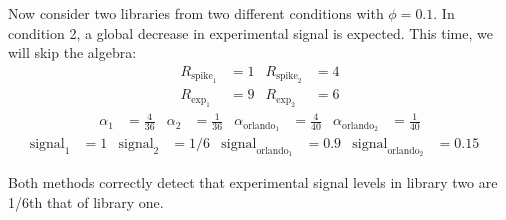 Now consider two libraries from two different conditions with $\phi=0.1$.
In condition 2, a global decrease in experimental signal is expected.
This time, we will skip the algebra:
\begin{align*}
    R_{\text{spike}_1} &= 1 & R_{\text{spike}_2} &= 4 \\
    R_{\text{exp}_1} &= 9 & R_{\text{exp}_2} &= 6
\end{align*}
\begin{align*}
    \alpha_1 &= \frac{4}{36} &
    \alpha_2 &= \frac{1}{36} &
    \alpha_{\text{orlando}_1} &= \frac{4}{40} &
    \alpha_{\text{orlando}_2} &= \frac{1}{40}
\end{align*}
\begin{align*}
    \text{signal}_1 &=  1 &
    \text{signal}_2 &=  1/6 &
    \text{signal}_{\text{orlando}_1} &= 0.9 &
    \text{signal}_{\text{orlando}_2} &= 0.15 &
\end{align*}

Both methods correctly detect that experimental signal levels in library two are 1/6th that of library one.

